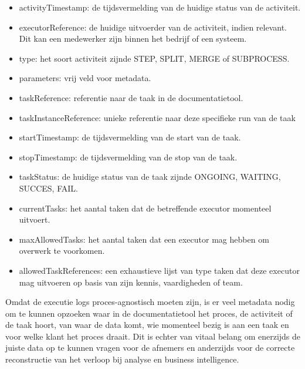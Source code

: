 \begin{itemize}
  \item activityTimestamp: de tijdsvermelding van de huidige status van de activiteit.
  \item executorReference: de huidige uitvoerder van de activiteit, indien relevant. Dit kan een medewerker zijn binnen het bedrijf of een systeem.
  \item type: het soort activiteit zijnde STEP, SPLIT, MERGE of SUBPROCESS.
  \item parameters: vrij veld voor metadata.
  \item taskReference: referentie naar de taak in de documentatietool.
  \item taskInstanceReference: unieke referentie naar deze specifieke run van de taak
  \item startTimestamp: de tijdsvermelding van de start van de taak.
  \item stopTimestamp: de tijdsvermelding van de stop van de taak.
  \item taskStatus: de huidige status van de taak zijnde ONGOING, WAITING, SUCCES, FAIL.
  \item currentTasks: het aantal taken dat de betreffende executor momenteel uitvoert.
  \item maxAllowedTasks: het aantal taken dat een executor mag hebben om overwerk te voorkomen.
  \item allowedTaskReferences: een exhaustieve lijst van type taken dat deze executor mag uitvoeren op basis van zijn kennis, vaardigheden of team.
\end{itemize}
Omdat de executie logs proces-agnostisch moeten zijn, is er veel metadata nodig om te kunnen opzoeken waar in de documentatietool het proces, de activiteit of de taak hoort, van waar de data komt, wie momenteel bezig is aan een taak en voor welke klant het proces draait.  Dit is echter van vitaal belang om enerzijds de juiste data op te kunnen vragen voor de afnemers en anderzijds voor de correcte reconstructie van het verloop bij analyse en business intelligence.
